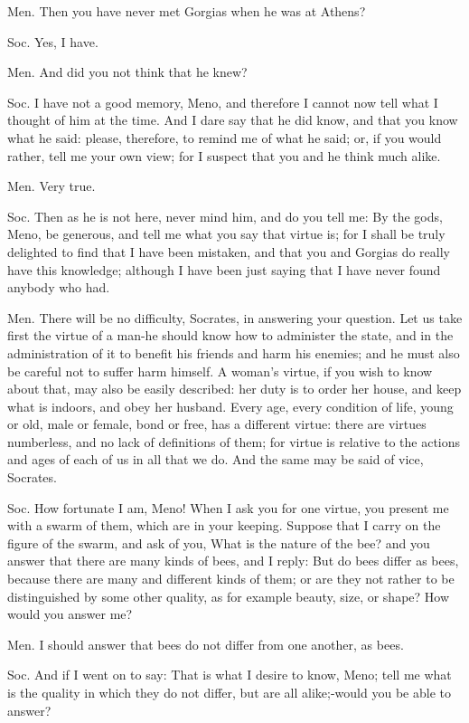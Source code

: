 Men. Then you have never met Gorgias when he was at Athens?

Soc. Yes, I have. 

Men. And did you not think that he knew? 

Soc. I have not a good memory, Meno, and therefore I cannot now tell
what I thought of him at the time. And I dare say that he did know,
and that you know what he said: please, therefore, to remind me of
what he said; or, if you would rather, tell me your own view; for
I suspect that you and he think much alike. 

Men. Very true. 

Soc. Then as he is not here, never mind him, and do you tell me: By
the gods, Meno, be generous, and tell me what you say that virtue
is; for I shall be truly delighted to find that I have been mistaken,
and that you and Gorgias do really have this knowledge; although I
have been just saying that I have never found anybody who had.

Men. There will be no difficulty, Socrates, in answering your question.
Let us take first the virtue of a man-he should know how to administer
the state, and in the administration of it to benefit his friends
and harm his enemies; and he must also be careful not to suffer harm
himself. A woman's virtue, if you wish to know about that, may also
be easily described: her duty is to order her house, and keep what
is indoors, and obey her husband. Every age, every condition of life,
young or old, male or female, bond or free, has a different virtue:
there are virtues numberless, and no lack of definitions of them;
for virtue is relative to the actions and ages of each of us in all
that we do. And the same may be said of vice, Socrates. 

Soc. How fortunate I am, Meno! When I ask you for one virtue, you
present me with a swarm of them, which are in your keeping. Suppose
that I carry on the figure of the swarm, and ask of you, What is the
nature of the bee? and you answer that there are many kinds of bees,
and I reply: But do bees differ as bees, because there are many and
different kinds of them; or are they not rather to be distinguished
by some other quality, as for example beauty, size, or shape? How
would you answer me? 

Men. I should answer that bees do not differ from one another, as
bees. 

Soc. And if I went on to say: That is what I desire to know, Meno;
tell me what is the quality in which they do not differ, but are all
alike;-would you be able to answer? 

